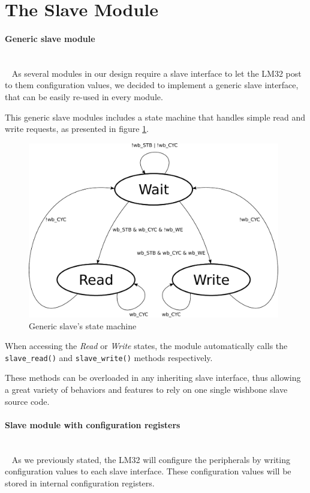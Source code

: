 
\section{The Slave Module}

\paragraph{Generic slave module}
~\\~
As several modules in our design require a slave interface to let the LM32 post to them configuration values, we decided to implement a generic slave interface, that can be easily re-used in every module.

This generic slave modules includes a state machine that handles simple read and write requests, as presented in figure \ref{state_machine_slave}.

\begin{figure}[h]
\center
\includegraphics[width=11cm]{figs/slave_state_machine.pdf}
\caption{Generic slave's state machine}
\label{state_machine_slave}
\end{figure}

When accessing the \emph{Read} or \emph{Write} states, the module automatically calls the \texttt{slave\_read()} and \texttt{slave\_write()} methods respectively.

These methods can be overloaded in any inheriting slave interface, thus allowing a great variety of behaviors and features to rely on one single wishbone slave source code.

\paragraph{Slave module with configuration registers}
~\\~
As we previously stated, the LM32 will configure the peripherals by writing configuration values to each slave interface.
These configuration values will be stored in internal configuration registers.

